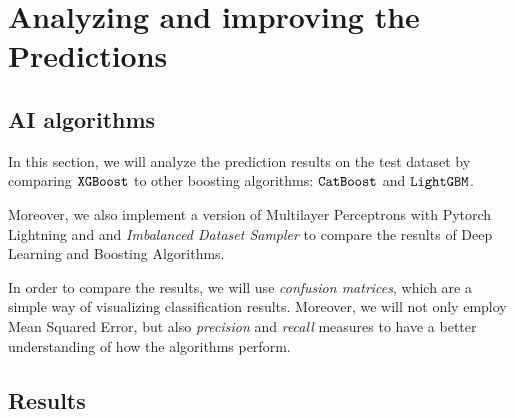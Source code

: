 \documentclass[12pt]{article}
\begin{document}
\section{Analyzing and improving the Predictions}
\subsection{AI algorithms}
In this section, we will analyze the prediction results on the test dataset by comparing $\tt XGBoost$ to other boosting algorithms: $\tt CatBoost$ and $\tt LightGBM$.

Moreover, we also implement a version of Multilayer Perceptrons with Pytorch Lightning \cite{falcon2019pytorch} and and \textit{Imbalanced Dataset Sampler} to compare the results of Deep Learning and Boosting Algorithms.

In order to compare the results, we will use \textit{confusion matrices}, which are a simple way of visualizing classification results. Moreover, we will not only employ Mean Squared Error, but also \textit{precision} and \textit{recall} measures to have a better understanding of how the algorithms perform.

\subsection{Results}
\end{document}
